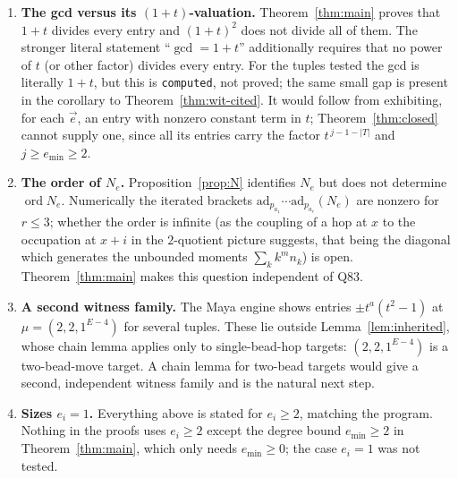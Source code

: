 \documentclass[11pt]{article}
\theoremstyle{definition}
\DeclareMathOperator{\ord}{ord}
\begin{document}
\begin{enumerate}
\item \textbf{The gcd versus its $(1+t)$-valuation.}  Theorem~\ref{thm:main} proves that
$1+t$ divides every entry and $(1+t)^2$ does not divide all of them.  The stronger literal
statement ``$\gcd=1+t$'' additionally requires that no power of $t$ (or other factor) divides
every entry.  For the tuples tested the gcd is literally $1+t$, but this is
\texttt{computed}, not proved; the same small gap is present in the corollary to
Theorem~\ref{thm:wit-cited}.  It would follow from exhibiting, for each $\vec e$, an entry with
nonzero constant term in $t$; Theorem~\ref{thm:closed} cannot supply one, since all its
entries carry the factor $t^{\,j-1-|T|}$ and $j\ge e_{\min}\ge2$.
\item \textbf{The order of $N_e$.}  Proposition~\ref{prop:N} identifies $N_e$ but does not
determine $\ord N_e$.  Numerically the iterated brackets
$\mathrm{ad}_{p_{a_1}}\!\cdots\mathrm{ad}_{p_{a_r}}(N_e)$ are nonzero for $r\le3$; whether the
order is infinite (as the coupling of a hop at $x$ to the occupation at $x+i$ in the
$2$-quotient picture suggests, that being the diagonal which generates the unbounded moments
$\sum_k k^m n_k$) is open.  Theorem~\ref{thm:main} makes this question independent of Q83.
\item \textbf{A second witness family.}  The Maya engine shows entries
$\pm t^{a}(t^2-1)$ at $\mu=(2,2,1^{E-4})$ for several tuples.  These lie outside
Lemma~\ref{lem:inherited}, whose chain lemma applies only to single-bead-hop targets:
$(2,2,1^{E-4})$ is a two-bead-move target.  A chain lemma for two-bead targets would give a
second, independent witness family and is the natural next step.
\item \textbf{Sizes $e_i=1$.}  Everything above is stated for $e_i\ge2$, matching the program.
Nothing in the proofs uses $e_i\ge2$ except the degree bound $e_{\min}\ge2$ in
Theorem~\ref{thm:main}, which only needs $e_{\min}\ge0$; the case $e_i=1$ was not tested.
\end{enumerate}
\end{document}
